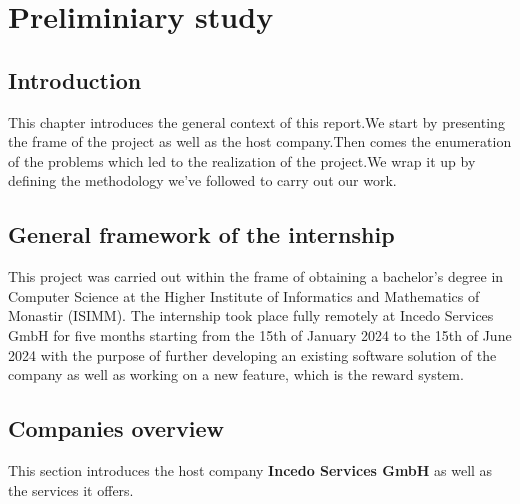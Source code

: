 \chapter{Preliminiary study}

\setcounter{secnumdepth}{0} %
\section{Introduction}
This chapter introduces the general context of this report.We start by presenting the frame of the project as well as the host company.Then comes the enumeration of the problems which led to the realization of the project.We wrap it up by defining the methodology we’ve followed to carry out our work.

\setcounter{secnumdepth}{3} %
\section{General framework of the internship}
This project was carried out within the frame of obtaining a bachelor’s degree in Computer Science at the Higher Institute of Informatics and Mathematics of Monastir (ISIMM).
The internship took place fully remotely at Incedo Services GmbH for five months starting from the 15th of January 2024 to the 15th of June 2024 with the purpose of further developing an existing software solution of the company as well as working on a new feature, which is the reward system.

\section{Companies overview}
This section introduces the host company {\bf Incedo Services GmbH} as well as the services it offers.
